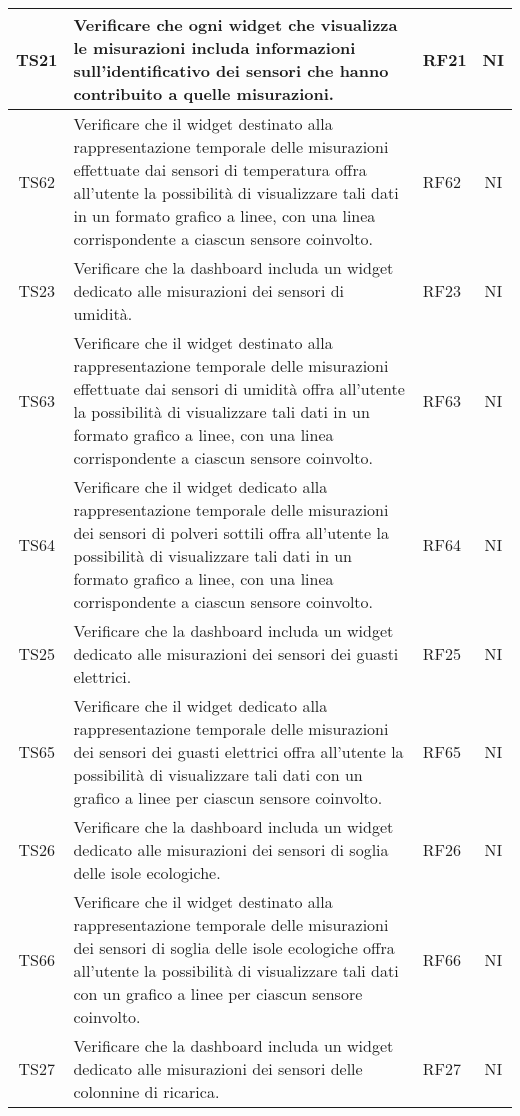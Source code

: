 \begin{longtable}{|c|p{5cm}|>{\raggedright}p{2cm}|c|}
        \hline
        TS21 & Verificare che ogni widget che visualizza le misurazioni includa informazioni sull'identificativo dei sensori che hanno contribuito a quelle misurazioni. & RF21 & NI \\
        \hline
        TS62 & Verificare che il widget destinato alla rappresentazione temporale delle misurazioni effettuate dai sensori di temperatura offra all'utente la possibilità di visualizzare tali dati in un formato grafico a linee, con una linea corrispondente a ciascun sensore coinvolto. & RF62 & NI \\
        \hline
        TS23 & Verificare che la dashboard includa un widget dedicato alle misurazioni dei sensori di umidità. & RF23 & NI \\
        \hline
        TS63 & Verificare che il widget destinato alla rappresentazione temporale delle misurazioni effettuate dai sensori di umidità offra all'utente la possibilità di visualizzare tali dati in un formato grafico a linee, con una linea corrispondente a ciascun sensore coinvolto. & RF63 & NI \\
        \hline
        TS64 & Verificare che il widget dedicato alla rappresentazione temporale delle misurazioni dei sensori di polveri sottili offra all'utente la possibilità di visualizzare tali dati in un formato grafico a linee, con una linea corrispondente a ciascun sensore coinvolto. & RF64 & NI \\
        \hline
        TS25 & Verificare che la dashboard includa un widget dedicato alle misurazioni dei sensori dei guasti elettrici. & RF25 & NI \\
        \hline
        TS65 & Verificare che il widget dedicato alla rappresentazione temporale delle misurazioni dei sensori dei guasti elettrici offra all'utente la possibilità di visualizzare tali dati con un grafico a linee per ciascun sensore coinvolto. & RF65 & NI \\
        \hline
        TS26 & Verificare che la dashboard includa un widget dedicato alle misurazioni dei sensori di soglia delle isole ecologiche. & RF26 & NI \\
        \hline
        TS66 & Verificare che il widget destinato alla rappresentazione temporale delle misurazioni dei sensori di soglia delle isole ecologiche offra all'utente la possibilità di visualizzare tali dati con un grafico a linee per ciascun sensore coinvolto. & RF66 & NI \\
        \hline
        TS27 & Verificare che la dashboard includa un widget dedicato alle misurazioni dei sensori delle colonnine di ricarica. & RF27 & NI \\

\end{longtable}
